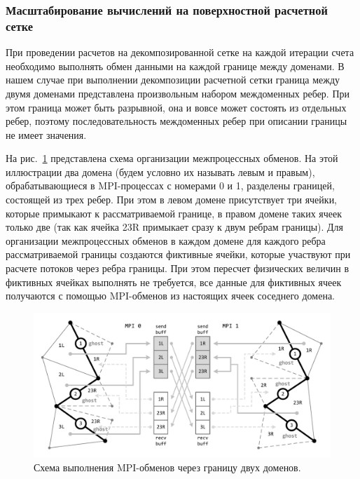 \subsubsection{Масштабирование вычислений на поверхностной расчетной сетке}

При проведении расчетов на декомпозированной сетке на каждой итерации счета необходимо выполнять обмен данными на каждой границе между доменами.
В нашем случае при выполнении декомпозиции расчетной сетки граница между двумя доменами представлена произвольным набором междоменных ребер.
При этом граница может быть разрывной, она и вовсе может состоять из отдельных ребер, поэтому последовательность междоменных ребер при описании границы не имеет значения.

На рис.~\ref{fig:text_2_scaling_mpi} представлена схема организации межпроцессных обменов.
На этой иллюстрации два домена (будем условно их называть левым и правым), обрабатывающиеся в MPI-процессах\label{abbr:mpi-5} с номерами 0 и 1, разделены границей, состоящей из трех ребер.
При этом в левом домене присутствует три ячейки, которые примыкают к рассматриваемой границе, в правом домене таких ячеек только две (так как ячейка 23R примыкает сразу к двум ребрам границы).
Для организации межпроцессных обменов в каждом домене для каждого ребра рассматриваемой границы создаются фиктивные ячейки, которые участвуют при расчете потоков через ребра границы.
При этом пересчет физических величин в фиктивных ячейках выполнять не требуется, все данные для фиктивных ячеек получаются с помощью MPI-обменов из настоящих ячеек соседнего домена.

\begin{figure}[ht]
\centering
\includegraphics[width=1.0\textwidth]{fig/par_surf_mpi.pdf}
\singlespacing
{}\caption{Схема выполнения MPI-обменов через границу двух доменов.}\label{fig:text_2_scaling_mpi}
\end{figure}

